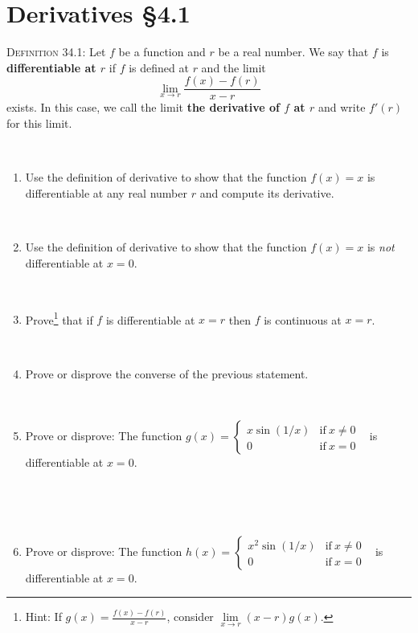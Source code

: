 \documentclass[12pt]{amsart}
\begin{document}
	
	
	\thispagestyle{empty}
	
	
	\section*{Derivatives \S4.1}
	
\begin{framed} 


 \noindent \textsc{Definition 34.1:}  Let $f$ be a function and $r$ be a real number. We say that $f$ is \textbf{differentiable at $r$} if $f$ is defined at $r$ and the limit
\[ \lim_{x\to r} \frac{ f(x) - f(r) }{x-r}\]
exists. In this case, we call the limit \textbf{the derivative of $f$ at $r$} and write $f'(r)$ for this limit. 
 
 
 
 
 \end{framed}


\

\begin{enumerate}
\item Use the definition of derivative to show that the function $f(x)=x$ is differentiable at any real number $r$ and compute its derivative.

\

\item Use the definition of derivative to show that the function $f(x)=x$ is \emph{not} differentiable at $x=0$.

\

\item Prove\footnote{Hint: If $\displaystyle g(x) = \frac{f(x)-f(r)}{x-r}$, consider $\lim\limits_{x\to r} (x-r) g(x)$.} that if $f$ is differentiable at $x=r$ then $f$ is continuous at $x=r$.

\

\item Prove or disprove the converse of the previous statement.

\

\item Prove or disprove: The function $g(x) = \begin{cases} x \sin(1/x) &\text{if} \ x \neq 0 \\ 0 & \text{if} \ x=0\end{cases}$ \  is differentiable at $x=0$.

\

\


\item Prove or disprove: The function $h(x) = \begin{cases} x^2 \sin(1/x) &\text{if} \ x \neq 0 \\ 0 & \text{if} \ x=0\end{cases}$ \  is differentiable at $x=0$.






\end{enumerate}
\end{document}
